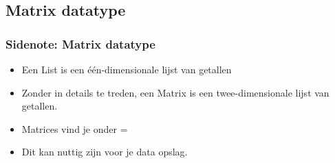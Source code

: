 \subsection{Matrix datatype}

\begin{frame}
\frametitle{Sidenote: Matrix datatype}


\begin{itemize}
  \item<1-> Een List is een \'e\'en-dimensionale lijst van getallen
  \item<2-> Zonder in details te treden, een Matrix is een twee-dimensionale lijst van getallen.
  \item<3-> Matrices vind je onder \tiSecond\tiXInv=\tiMATRIX
  \item<4-> Dit kan nuttig zijn voor je data opslag.
\end{itemize}

\end{frame}
